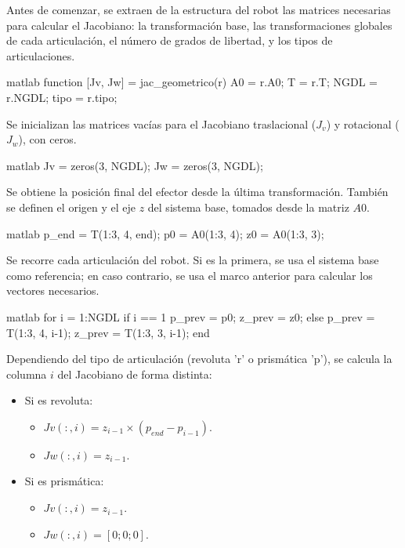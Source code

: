 Antes de comenzar, se extraen de la estructura del robot las matrices necesarias para calcular el Jacobiano: la transformación base, las transformaciones globales de cada articulación, el número de grados de libertad, y los tipos de articulaciones.

\begin{matlabcode}{matlab}
	function [Jv, Jw] = jac_geometrico(r)
	A0 = r.A0;
	T = r.T;
	NGDL = r.NGDL;
	tipo = r.tipo;
\end{matlabcode}

Se inicializan las matrices vacías para el Jacobiano traslacional ($J_v$) y rotacional ($J_w$), con ceros.

\begin{matlabcode}{matlab}
	Jv = zeros(3, NGDL);
	Jw = zeros(3, NGDL);
\end{matlabcode}

Se obtiene la posición final del efector desde la última transformación. También se definen el origen y el eje $z$ del sistema base, tomados desde la matriz $A0$.

\begin{matlabcode}{matlab}
	p_end = T(1:3, 4, end);
	p0 = A0(1:3, 4);
	z0 = A0(1:3, 3);
\end{matlabcode}

Se recorre cada articulación del robot. Si es la primera, se usa el sistema base como referencia; en caso contrario, se usa el marco anterior para calcular los vectores necesarios.

\begin{matlabcode}{matlab}
	for i = 1:NGDL
	if i == 1
	p_prev = p0;
	z_prev = z0;
	else
	p_prev = T(1:3, 4, i-1);
	z_prev = T(1:3, 3, i-1);
	end
\end{matlabcode}

Dependiendo del tipo de articulación (revoluta 'r' o prismática 'p'), se calcula la columna $i$ del Jacobiano de forma distinta:
\begin{itemize}
	\item Si es revoluta:
	\begin{itemize}
		\item $Jv(:,i) = z_{i-1} \times (p_{end} - p_{i-1})$.
		\item $Jw(:,i) = z_{i-1}$.
	\end{itemize}
	\item Si es prismática:
	\begin{itemize}
		\item $Jv(:,i) = z_{i-1}$.
		\item $Jw(:,i) = [0; 0; 0]$.
	\end{itemize}
\end{itemize}


